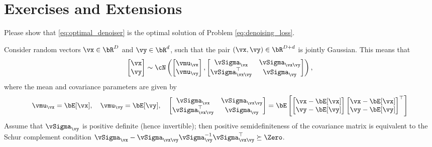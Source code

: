 \documentclass[../../book-main.tex]{subfiles}
\begin{document}
\section{Exercises and Extensions}

\begin{exercise}
    Please show that \eqref{eq:optimal_denoiser} is the optimal solution of Problem \eqref{eq:denoising_loss}. 
\end{exercise}

\begin{exercise}\label{exercise:conditional_gaussian}
  Consider random vectors $\vx \in \bR^D$ and $\vy \in \bR^d$, such that the
  pair $(\vx, \vy) \in \bR^{D + d}$ is jointly Gaussian. This means that
  \begin{equation*}
    \begin{bmatrix}
      \vx \\
      \vy
    \end{bmatrix}
    \sim
    \cN \left(
      \begin{bmatrix}
        \vmu_{\vx} \\
        \vmu_{\vy}
      \end{bmatrix}
      ,
      \begin{bmatrix}
        \vSigma_{\vx} & \vSigma_{\vx\vy} \\
        \vSigma_{\vx\vy}^\top & \vSigma_{\vy}
      \end{bmatrix}
    \right),
  \end{equation*}
  where the mean and covariance parameters are given by
  \begin{equation*}
    \vmu_{\vx} = \bE[\vx],\quad \vmu_{\vy} = \bE[\vy],\quad
    \begin{bmatrix}
      \vSigma_{\vx} & \vSigma_{\vx\vy} \\
      \vSigma_{\vx\vy}^\top & \vSigma_{\vy}
    \end{bmatrix}
    =
    \bE\left[
      \begin{bmatrix}
        \vx - \bE[\vx] \\
        \vy - \bE[\vy]
      \end{bmatrix}
      \begin{bmatrix}
        \vx - \bE[\vx] \\
        \vy - \bE[\vy]
      \end{bmatrix}^\top
      \right]
  \end{equation*}
  Assume that $\vSigma_{\vy}$ is positive definite (hence invertible); then
  positive semidefiniteness of the covariance matrix is equivalent to the Schur
  complement condition $\vSigma_{\vx} - \vSigma_{\vx\vy} \vSigma_{\vy}^{-1}
  \vSigma_{\vx\vy}^\top \succeq \Zero$.


\end{exercise}
\end{document}
